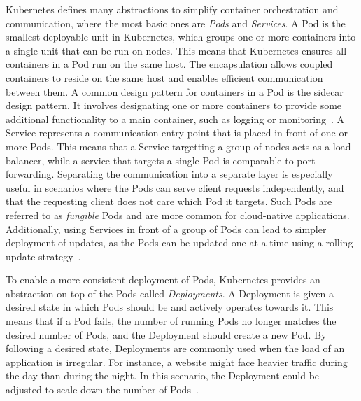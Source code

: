\documentclass{kththesis}
\begin{document}
Kubernetes defines many abstractions to simplify container orchestration and communication, where the most basic ones are \textit{Pods} and \textit{Services}. A Pod is the smallest deployable unit in Kubernetes, which groups one or more containers into a single unit that can be run on nodes. This means that Kubernetes ensures all containers in a Pod run on the same host. The encapsulation allows coupled containers to reside on the same host and enables efficient communication between them. A common design pattern for containers in a Pod is the sidecar design pattern. It involves designating one or more containers to provide some additional functionality to a main container, such as logging or monitoring\ \cite{k8s-docs-pods, k8s-docs-sidecars}. A Service represents a communication entry point that is placed in front of one or more Pods. This means that a Service targetting a group of nodes acts as a load balancer, while a service that targets a single Pod is comparable to port-forwarding. Separating the communication into a separate layer is especially useful in scenarios where the Pods can serve client requests independently, and that the requesting client does not care which Pod it targets. Such Pods are referred to as \textit{fungible} Pods and are more common for cloud-native applications. Additionally, using Services in front of a group of Pods can lead to simpler deployment of updates, as the Pods can be updated one at a time using a rolling update strategy\ \cite{k8s-docs-services}. 

To enable a more consistent deployment of Pods, Kubernetes provides an abstraction on top of the Pods called \textit{Deployments}. A Deployment is given a desired state in which Pods should be and actively operates towards it. This means that if a Pod fails, the number of running Pods no longer matches the desired number of Pods, and the Deployment should create a new Pod. By following a desired state, Deployments are commonly used when the load of an application is irregular. For instance, a website might face heavier traffic during the day than during the night. In this scenario, the Deployment could be adjusted to scale down the number of Pods\ \cite{k8s-docs-deployments, k8s-overview}. 
\end{document}
